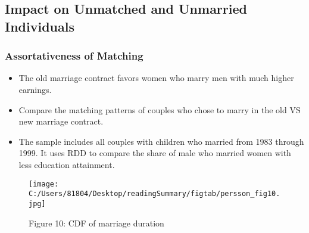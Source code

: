 \documentclass[a4paper, 12pt]{article}
\begin{document}
\subsection{Impact on Unmatched and Unmarried Individuals}

\subsubsection{Assortativeness of Matching}
\begin{itemize}
\item The old marriage contract favors women who marry men with much higher earnings.
\item Compare the matching patterns of couples who chose to marry in the old VS new marriage contract.
\item The sample includes all couples with children who married from 1983 through 1999. It uses RDD to compare the share of male who married women with less education attainment.
\end{itemize}

\begin{figure}[h!]
\center
\texttt{[image: C:/Users/81804/Desktop/readingSummary/figtab/persson\_fig10.jpg]}
\caption*{Figure 10: CDF of marriage duration}
\end{figure}
\end{document}
